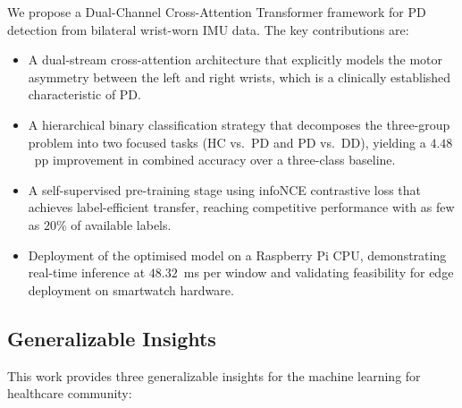 \documentclass[pmlr]{jmlr}
\begin{document}
We propose a Dual-Channel Cross-Attention Transformer framework for PD
detection from bilateral wrist-worn IMU data. The key contributions are:
\begin{itemize}
  \item A dual-stream cross-attention architecture that explicitly
        models the motor asymmetry between the left and right wrists,
        which is a clinically established characteristic of PD.
  \item A hierarchical binary classification strategy that decomposes
        the three-group problem into two focused tasks (HC vs.~PD and
        PD vs.~DD), yielding a $4.48$~pp improvement in combined
        accuracy over a three-class baseline.
  \item A self-supervised pre-training stage using infoNCE contrastive
        loss that achieves label-efficient transfer, reaching
        competitive performance with as few as $20\%$ of available
        labels.
  \item Deployment of the optimised model on a Raspberry Pi CPU,
        demonstrating real-time inference at $48.32$~ms per window and
        validating feasibility for edge deployment on smartwatch
        hardware.
\end{itemize}

\subsection*{Generalizable Insights}
\label{sec:insights}

This work provides three generalizable insights for the machine
learning for healthcare community:
\end{document}
